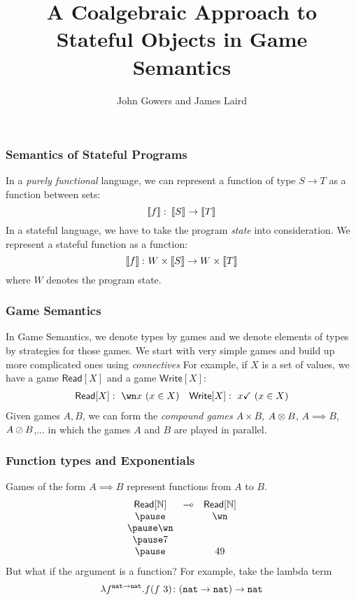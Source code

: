 \documentclass{beamer}
\title{A Coalgebraic Approach to Stateful Objects in Game Semantics}
\author{John Gowers and James Laird}
\newcommand{\Read}{{\mathsf{Read}}}
\newcommand{\Write}{{\mathsf{Write}}}
\newcommand{\tick}{\checkmark}
\begin{document}
\begin{frame}
  \titlepage
\end{frame}

\begin{frame}
  \frametitle{Semantics of Stateful Programs}
  In a \emph{purely functional} language, we can represent a function of type $S\to T$ as a function between sets:
  \[
    \left\llbracket f\right\rrbracket\colon\left\llbracket S\right\rrbracket\to\left\llbracket T\right\rrbracket
    \]
  \pause
  In a stateful language, we have to take the program \emph{state} into consideration.
  \pause
  We represent a stateful function as a function:
  \[
    \left\llbracket f\right\rrbracket\colon W \times \left\llbracket S\right\rrbracket\to W \times \left\llbracket T\right\rrbracket
    \]
  where $W$ denotes the program state.
\end{frame}

\begin{frame}
  \frametitle{Game Semantics}
  In Game Semantics, we denote types by games and we denote elements of types by strategies for those games.  
  \pause
  We start with very simple games and build up more complicated ones using \emph{connectives}
  \pause
  For example, if $X$ is a set of values, we have a game $\Read[X]$ and a game $\Write[X]$:
  \[
    \begin{array}{cc}
      \Read[X]:\ \wn x\ (x\in X)
        & \Write[X]:\  x\tick\ (x\in X)
    \end{array}
    \]
  \pause
  Given games $A,B$, we can form the \emph{compound games} $A\times B$, $A\otimes B$, $A\implies B$, $A\oslash B$,... in which the games $A$ and $B$ are played in parallel.
\end{frame}

\begin{frame}
  \frametitle{Function types and Exponentials}
  Games of the form $A\implies B$ represent functions from $A$ to $B$.
  \pause
  \[
    \begin{array}{ccc}
      \Read[\bN] & \implies & \Read[\bN] \\
      \pause
      & & \wn \\
      \pause
      \wn & & \\
      \pause
      7 & & \\
      \pause
      & & 49
    \end{array}
    \]
  \pause
  But what if the argument is a function?
  \pause
  For example, take the lambda term
  \[
    \lambda f^{{\mathtt{nat}}\to{\mathtt{nat}}}.f(f\ 3)\colon ({\mathtt{nat}}\to{\mathtt{nat}})\to{\mathtt{nat}}
    \]
\end{frame}
\end{document}

